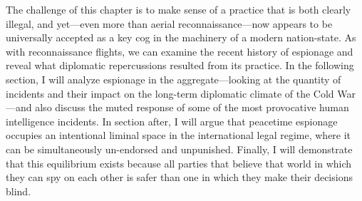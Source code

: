 \documentclass{memoir}
\begin{document}
\begin{refsegment}
The challenge of this chapter is to make sense of a practice that is both clearly illegal, and yet---even more than aerial reconnaissance---now appears to be universally accepted as a key cog in the machinery of a modern nation-state. As with reconnaissance flights, we can examine the recent history of espionage and reveal what diplomatic repercussions resulted from its practice. In the following section, I will analyze espionage in the aggregate---looking at the quantity of incidents and their impact on the long-term diplomatic climate of the Cold War---and also discuss the muted response of some of the most provocative human intelligence incidents. In section after, I will argue that peacetime espionage occupies an intentional liminal space in the international legal regime, where it can be simultaneously un-endorsed and unpunished. Finally, I will demonstrate that this equilibrium exists because all parties that believe that world in which they can spy on each other is safer than one in which they make their decisions blind.





\end{refsegment}
\end{document}
